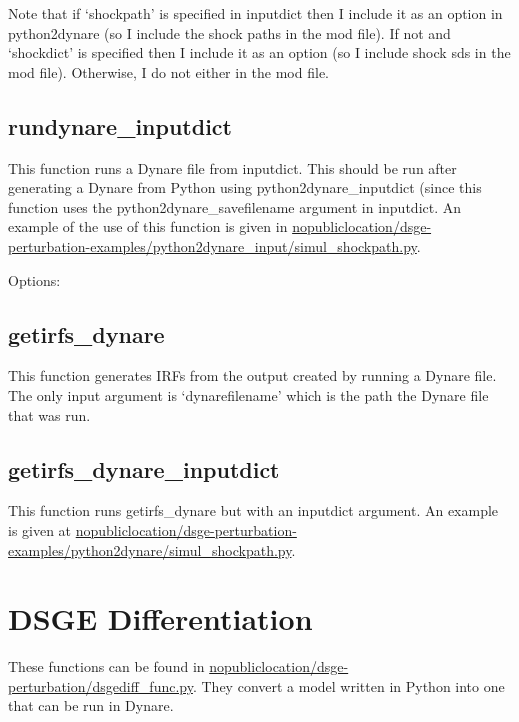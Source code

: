\documentclass{article}
\theoremstyle{definition}
\begin{document}
Note that if `shockpath' is specified in inputdict then I include it as an option in python2dynare (so I include the shock paths in the mod file). If not and `shockdict' is specified then I include it as an option (so I include shock sds in the mod file). Otherwise, I do not either in the mod file.





\subsection{rundynare\_inputdict}
This function runs a Dynare file from inputdict. This should be run after generating a Dynare from Python using python2dynare\_inputdict (since this function uses the python2dynare\_savefilename argument in inputdict. An example of the use of this function is given in \url{nopubliclocation/dsge-perturbation-examples/python2dynare_input/simul_shockpath.py}.

Options:

\subsection{getirfs\_dynare}
This function generates IRFs from the output created by running a Dynare file. The only input argument is `dynarefilename' which is the path the Dynare file that was run.

\subsection{getirfs\_dynare\_inputdict}
This function runs getirfs\_dynare but with an inputdict argument. An example is given at \url{nopubliclocation/dsge-perturbation-examples/python2dynare/simul_shockpath.py}.

\section{DSGE Differentiation}
These functions can be found in \url{nopubliclocation/dsge-perturbation/dsgediff_func.py}. They convert a model written in Python into one that can be run in Dynare.
\end{document}
